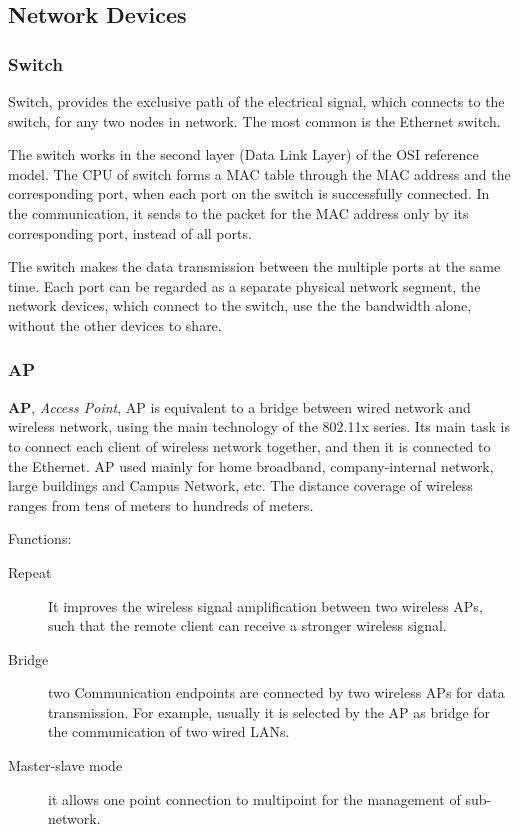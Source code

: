 \subsection{Network Devices}

\subsubsection{Switch}

Switch, provides the exclusive path of the electrical signal, which connects to the switch, for any two nodes in network. The most common is the Ethernet switch.  

The switch works in the second layer (Data Link Layer) of the OSI reference model. The CPU of switch forms a MAC table  through the MAC address and the corresponding port, when each port on the switch is successfully connected. In the communication, it sends to the packet for the MAC address only by its corresponding port, instead of all ports.  

The switch makes the data transmission between the multiple ports at the same time. Each port can be regarded as a separate physical network segment, the network devices, which connect to the switch, use the the bandwidth alone, without the other devices to share. 

\subsubsection{AP}

\textbf{AP}, \textit{Access Point}, AP is equivalent to a bridge between wired network and wireless network, using the main technology of the 802.11x series. Its main task is to connect each client of wireless network together, and then it is connected to the Ethernet. AP used mainly for home broadband, company-internal network, large buildings and Campus Network, etc. The distance coverage of wireless ranges from tens of meters to hundreds of meters.  

Functions: 

\begin{description}
	\item[Repeat] It improves the wireless signal amplification between two wireless APs, such that the remote client can receive a stronger wireless signal.  
	\item[Bridge] two Communication endpoints are connected by two wireless APs for data transmission. For example, usually it is selected by the AP as bridge for the communication of two wired LANs.  
	\item[Master-slave mode] it allows one point connection to multipoint for the management of sub-network.  
\end{description}
